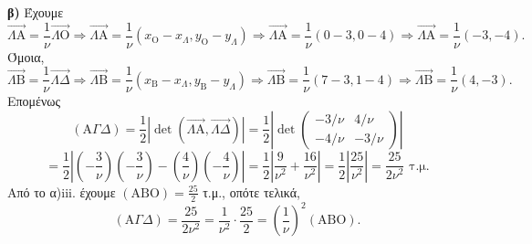 \textbf{β)} Έχουμε
\[
\vec{\Lambda\mathrm{A}} = \frac{1}{\nu}\vec{\Lambda\mathrm{O}} \Rightarrow \vec{\Lambda\mathrm{A}} = \frac{1}{\nu}(x_\mathrm{O} - x_\Lambda, y_\mathrm{O} - y_\Lambda) \Rightarrow \vec{\Lambda\mathrm{A}} = \frac{1}{\nu}(0-3, 0-4) \Rightarrow \vec{\Lambda\mathrm{A}} = \frac{1}{\nu}(-3, -4).
\]
Όμοια,
\[
\vec{\Lambda\mathrm{B}} = \frac{1}{\nu}\vec{\Lambda\Delta} \Rightarrow \vec{\Lambda\mathrm{B}} = \frac{1}{\nu}(x_\mathrm{B} - x_\Lambda, y_\mathrm{B} - y_\Lambda) \Rightarrow \vec{\Lambda\mathrm{B}} = \frac{1}{\nu}(7-3, 1-4) \Rightarrow \vec{\Lambda\mathrm{B}} = \frac{1}{\nu}(4, -3).
\]
Επομένως
\[
(\mathrm{A}\Gamma\Delta) = \frac{1}{2}\left|\det(\vec{\Lambda\mathrm{A}}, \vec{\Lambda\Delta})\right| = \frac{1}{2}\left|\det\begin{pmatrix} -3/\nu & 4/\nu \\ -4/\nu & -3/\nu \end{pmatrix}\right|
\]
\[
= \frac{1}{2}\left|\left(-\frac{3}{\nu}\right)\left(-\frac{3}{\nu}\right) - \left(\frac{4}{\nu}\right)\left(-\frac{4}{\nu}\right)\right| = \frac{1}{2}\left|\frac{9}{\nu^2} + \frac{16}{\nu^2}\right| = \frac{1}{2}\left|\frac{25}{\nu^2}\right| = \frac{25}{2\nu^2} \text{ τ.μ.}
\]
Από το α)iii. έχουμε $(\mathrm{ABO}) = \frac{25}{2}$ τ.μ., οπότε τελικά,
\[
(\mathrm{A}\Gamma\Delta) = \frac{25}{2\nu^2} = \frac{1}{\nu^2} \cdot \frac{25}{2} = \left(\frac{1}{\nu}\right)^2 (\mathrm{ABO}).
\]